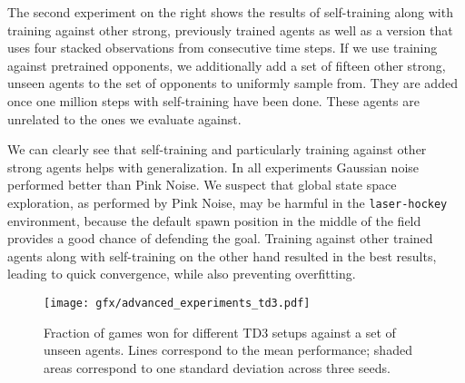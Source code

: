 The second experiment on the right shows the results of self-training along with training against other strong, previously trained agents as well as a version that uses four stacked observations from consecutive time steps. If we use training against pretrained opponents, we additionally add a set of fifteen other strong, unseen agents to the set of opponents to uniformly sample from. They are added once one million steps with self-training have been done. These agents are unrelated to the ones we evaluate against.

We can clearly see that self-training and particularly training against other strong agents helps with generalization. In all experiments Gaussian noise performed better than Pink Noise. We suspect that global state space exploration, as performed by Pink Noise, may be harmful in the \texttt{laser-hockey} environment, because the default spawn position in the middle of the field provides a good chance of defending the goal. Training against other trained agents along with self-training on the other hand resulted in the best results, leading to quick convergence, while also preventing overfitting.

\begin{figure}
    \centering
    \texttt{[image: gfx/advanced\_experiments\_td3.pdf]}
    \caption{Fraction of games won for different TD3 setups against a set of unseen agents. Lines correspond to the mean performance; shaded areas correspond to one standard deviation across three seeds.}
    \label{fig:td3_experiments}
\end{figure}